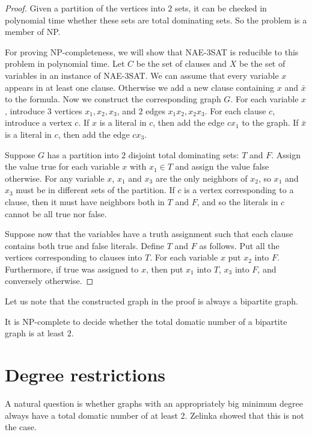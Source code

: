 \begin{proof}
  Given a partition of the vertices into $2$ sets, it can be checked in polynomial
  time whether these sets are total dominating sets. So the problem is a member
  of NP.

  For proving NP-completeness, we will show that NAE-3SAT is reducible to this problem
  in polynomial time. Let $C$ be the set of clauses and $X$ be the set of variables
  in an instance of NAE-3SAT. We can assume that every variable $x$ appears in at least
  one clause. Otherwise we add a new clause containing $x$ and $\bar{x}$ to
  the formula. Now we construct the corresponding graph $G$. For each variable $x$,
  introduce $3$ vertices $x_1, x_2, x_3$, and $2$ edges $x_1x_2, x_2x_3$. For each
  clause $c$, introduce a vertex $c$. If $x$ is a literal in $c$, then add the edge
  $cx_1$ to the graph. If $\bar{x}$ is a literal in $c$, then add the edge $cx_3$.

  Suppose $G$ has a partition into $2$ disjoint total dominating sets: $T$ and $F$.
  Assign the value true for each variable $x$ with $x_1 \in T$ and assign the value
  false otherwise. For any variable $x$, $x_1$ and $x_3$ are the only neighbors
  of $x_2$, so $x_1$ and $x_3$ must be in different sets of the partition. If $c$
  is a vertex corresponding to a clause, then it must have neighbors both in $T$
  and $F$, and so the literals in $c$ cannot be all true nor false.

  Suppose now that the variables have a truth assignment such that each clause
  contains both true and false literals. Define $T$ and $F$ as follows. Put all
  the vertices corresponding to clauses into $T$. For each variable $x$ put $x_2$
  into $F$. Furthermore, if true was assigned to $x$, then put $x_1$ into $T$, $x_3$
  into $F$, and conversely otherwise.
\end{proof}

Let us note that the constructed graph in the proof is always a bipartite
graph.

\begin{cor}
  It is NP-complete to decide whether the total domatic number of
  a bipartite graph is at least $2$.
\end{cor}

\section{Degree restrictions}

A natural question is whether graphs with an appropriately big minimum degree
always have a total domatic number of at least $2$. Zelinka \cite{zelinka} showed
that this is not the case.

